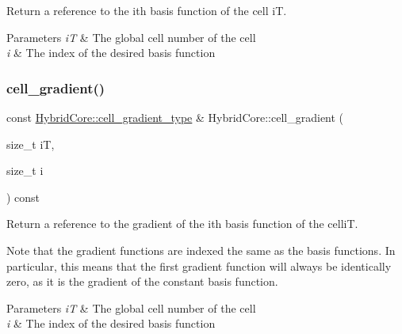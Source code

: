 Return a reference to the i\textquotesingle{}th basis function of the cell iT. 


\begin{DoxyParams}{Parameters}
{\em iT} & The global cell number of the cell \\
\hline
{\em i} & The index of the desired basis function \\
\hline
\end{DoxyParams}
\mbox{\label{classHArDCore3D_1_1HybridCore_a710fc23b914623b90a2699ab4291e539}} 
\subsubsection{\texorpdfstring{cell\+\_\+gradient()}{cell\_gradient()}}
{\footnotesize\ttfamily const \hyperlink{classHArDCore3D_1_1HybridCore_ad4dd9ca67d6de59d7ea71c816d3d3e67}{Hybrid\+Core\+::cell\+\_\+gradient\+\_\+type} \& Hybrid\+Core\+::cell\+\_\+gradient (\begin{DoxyParamCaption}\item[{size\+\_\+t}]{iT,  }\item[{size\+\_\+t}]{i }\end{DoxyParamCaption}) const}



Return a reference to the gradient of the i\textquotesingle{}th basis function of the celliT. 

Note that the gradient functions are indexed the same as the basis functions. In particular, this means that the first gradient function will always be identically zero, as it is the gradient of the constant basis function. 
\begin{DoxyParams}{Parameters}
{\em iT} & The global cell number of the cell \\
\hline
{\em i} & The index of the desired basis function \\
\hline
\end{DoxyParams}
\mbox{\label{classHArDCore3D_1_1HybridCore_aa7006921a9e212784abf688f63a855a0}} 
